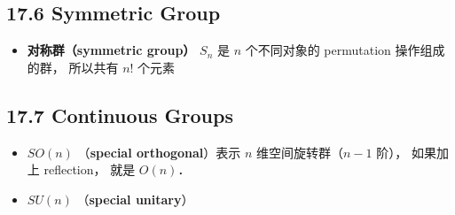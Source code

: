 \subsection{17.6 Symmetric Group}
\begin{itemize}
\item \textbf{对称群（symmetric group）} $S_n$ 是 $n$ 个不同对象的 permutation 操作组成的群， 所以共有 $n!$ 个元素
\end{itemize}

\subsection{17.7 Continuous Groups}
\begin{itemize}
\item $SO(n)$ （\textbf{special orthogonal}）表示 $n$ 维空间旋转群（$n-1$ 阶）， 如果加上 reflection， 就是 $O(n)$．
\item $SU(n)$ （\textbf{special unitary}）
\end{itemize}
